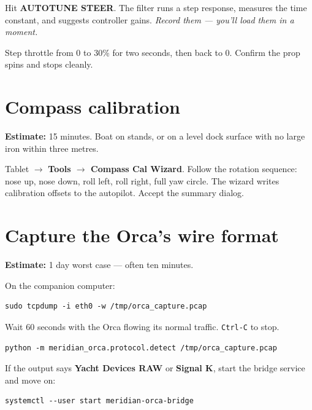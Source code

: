 \documentclass[10pt,a4paper]{article}
\begin{document}
\begin{stepbox}
Hit \textbf{AUTOTUNE STEER}. The filter runs a step response, measures
the time constant, and suggests controller gains. \emph{Record them ---
you'll load them in a moment.}
\end{stepbox}

\begin{stepbox}
Step throttle from 0 to 30\% for two seconds, then back to 0. Confirm
the prop spins and stops cleanly.
\end{stepbox}

\begin{safetybox}
\end{safetybox}

\section{Compass calibration}
\textbf{Estimate:} 15 minutes. Boat on stands, or on a level dock
surface with no large iron within three metres.

\begin{stepbox}
Tablet $\rightarrow$ \textbf{Tools $\rightarrow$ Compass Cal Wizard}. Follow the
rotation sequence: nose up, nose down, roll left, roll right, full
yaw circle. The wizard writes calibration offsets to the autopilot.
Accept the summary dialog.
\end{stepbox}

\section{Capture the Orca's wire format}
\textbf{Estimate:} 1 day worst case --- often ten minutes.

\begin{stepbox}
On the companion computer:
\begin{lstlisting}
sudo tcpdump -i eth0 -w /tmp/orca_capture.pcap
\end{lstlisting}
Wait 60 seconds with the Orca flowing its normal traffic. \texttt{Ctrl-C}
to stop.
\end{stepbox}

\begin{stepbox}
\begin{lstlisting}
python -m meridian_orca.protocol.detect /tmp/orca_capture.pcap
\end{lstlisting}
If the output says \textbf{Yacht Devices RAW} or \textbf{Signal K},
start the bridge service and move on:
\begin{lstlisting}
systemctl --user start meridian-orca-bridge
\end{lstlisting}
\end{stepbox}
\end{document}
